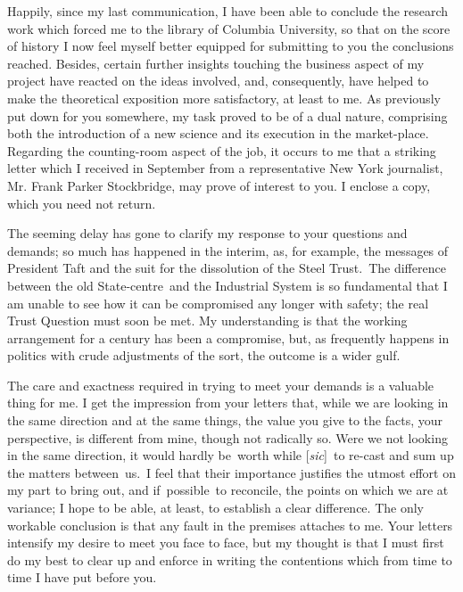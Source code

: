 \documentclass[openany,nobib]{tufte-book}
\begin{document}
Happily, since my last communication, I have been able to conclude the
research work which forced me to the library of Columbia University, so
that on the score of history I now feel myself better equipped for
submitting to you the conclusions reached. Besides, certain further
insights touching the business aspect of my project have reacted on the
ideas involved, and, consequently, have helped to make the theoretical
exposition more satisfactory, at least to me. As previously put down for
you somewhere, my task proved to be of a dual nature, comprising both
the introduction of a new science and its execution in the market-place.
Regarding the counting-room aspect of the job, it occurs to me that a
striking letter which I received in September from a representative New
York journalist, Mr. Frank Parker Stockbridge, may prove of interest to
you. I enclose a copy, which you need not return.~

The seeming delay has gone to clarify my response to your questions and
demands; so much has happened in the interim, as, for example, the
messages of President Taft and the suit for the dissolution of the Steel
Trust.~The difference between the old State-centre~and the Industrial
System is so fundamental that I am unable to see how it can be
compromised any longer with safety; the real Trust Question must soon be
met. My understanding is that the working arrangement for a century has
been a compromise, but, as frequently happens in politics with crude
adjustments of the sort, the outcome is a wider gulf.~

The care and exactness required in trying to meet your demands is a
valuable thing for me. I get the impression from your letters that,
while we are looking in the same direction and at the same things, the
value you give to the facts, your perspective, is different from mine,
though not radically so. Were we not looking in the same direction, it
would hardly be~worth while {[}\emph{sic}{]}~to re-cast and sum up the
matters between~us.~I feel that their importance justifies the utmost
effort on my part to bring out, and if~possible~to reconcile, the points
on which we are at variance; I hope to be able, at least, to establish a
clear difference. The only workable conclusion is that any fault in the
premises attaches to me. Your letters intensify my desire to meet you
face to face, but my thought is that I must first do my best to clear up
and enforce in writing the contentions which from time to time I have
put before you.~
\end{document}
